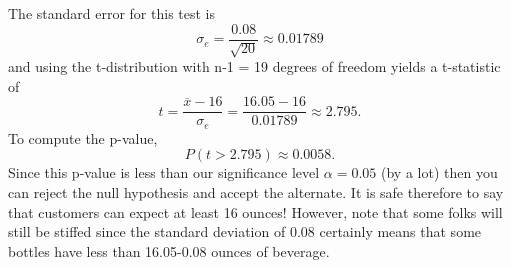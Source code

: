 \documentclass[10pt,]{book}
\numberwithin{equation}{section}
\newcommand{\gt}{>}
\begin{document}
\par
\hypertarget{p-1202}{}%
The standard error for this test is%
\begin{equation*}
\sigma_e = \frac{0.08}{\sqrt{20}} \approx 0.01789
\end{equation*}
and using the t-distribution with n-1 = 19 degrees of freedom yields a t-statistic of%
\begin{equation*}
t = \frac{\overline{x} - 16}{\sigma_e} = \frac{16.05-16}{0.01789} \approx 2.795.
\end{equation*}
To compute the p-value,%
\begin{equation*}
P(t \gt 2.795) \approx 0.0058.
\end{equation*}
Since this p-value is less than our significance level \(\alpha = 0.05\) (by a lot) then you can reject the null hypothesis and accept the alternate. It is safe therefore to say that customers can expect at least 16 ounces! However, note that some folks will still be stiffed since the standard deviation of 0.08 certainly means that some bottles have less than 16.05-0.08 ounces of beverage.%
%
%
\typeout{************************************************}
\typeout{************************************************}
%
\end{document}
